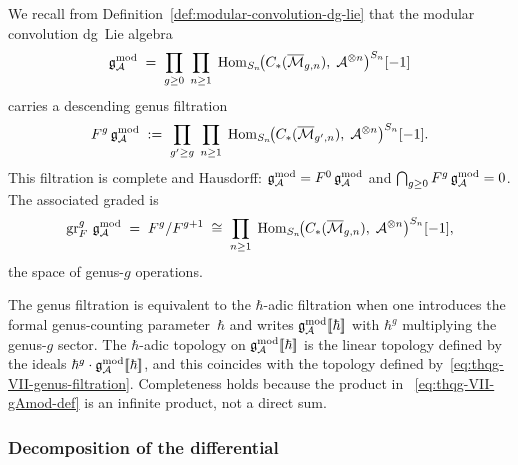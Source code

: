 We recall from Definition~\ref{def:modular-convolution-dg-lie}
that the modular convolution dg~Lie algebra
\begin{equation}\label{eq:thqg-VII-gAmod-def}
\mathfrak{g}_{\mathcal{A}}^{\mathrm{mod}}
\;=\;
\prod_{g \geq 0}\;
\prod_{n \geq 1}\;
\operatorname{Hom}_{S_n}\!\bigl(
C_*(\overline{\mathcal{M}}_{g,n}),\;
\mathcal{A}^{\otimes n}
\bigr)^{S_n}[-1]
\end{equation}
carries a descending genus filtration
\begin{equation}\label{eq:thqg-VII-genus-filtration}
F^g\,\mathfrak{g}_{\mathcal{A}}^{\mathrm{mod}}
\;:=\;
\prod_{g' \geq g}\;
\prod_{n \geq 1}\;
\operatorname{Hom}_{S_n}\!\bigl(
C_*(\overline{\mathcal{M}}_{g',n}),\;
\mathcal{A}^{\otimes n}
\bigr)^{S_n}[-1].
\end{equation}
This filtration is complete and Hausdorff:
$\mathfrak{g}_{\mathcal{A}}^{\mathrm{mod}} = F^0\,\mathfrak{g}_{\mathcal{A}}^{\mathrm{mod}}$ and
$\bigcap_{g \geq 0} F^g\,\mathfrak{g}_{\mathcal{A}}^{\mathrm{mod}} = 0$.
The associated graded is
\begin{equation}\label{eq:thqg-VII-assoc-graded}
\operatorname{gr}^g_F\,\mathfrak{g}_{\mathcal{A}}^{\mathrm{mod}}
\;=\;
F^g / F^{g+1}
\;\cong\;
\prod_{n \geq 1}\;
\operatorname{Hom}_{S_n}\!\bigl(
C_*(\overline{\mathcal{M}}_{g,n}),\;
\mathcal{A}^{\otimes n}
\bigr)^{S_n}[-1],
\end{equation}
the space of genus-$g$ operations.

\begin{remark}
\label{rem:thqg-VII-hbar-topology}
The genus filtration is equivalent to the $\hbar$-adic filtration
when one introduces the formal genus-counting parameter~$\hbar$
and writes $\mathfrak{g}_{\mathcal{A}}^{\mathrm{mod}}[\![\hbar]\!]$ with $\hbar^g$ multiplying the
genus-$g$ sector. The $\hbar$-adic topology on
$\mathfrak{g}_{\mathcal{A}}^{\mathrm{mod}}[\![\hbar]\!]$ is the linear topology defined by the
ideals $\hbar^g \cdot \mathfrak{g}_{\mathcal{A}}^{\mathrm{mod}}[\![\hbar]\!]$, and this coincides
with the topology defined by~\eqref{eq:thqg-VII-genus-filtration}.
Completeness holds because the product in~%
\eqref{eq:thqg-VII-gAmod-def} is an infinite product, not
a direct sum.
\end{remark}

\subsubsection{Decomposition of the differential}
\label{subsubsec:thqg-VII-differential-decomp}

